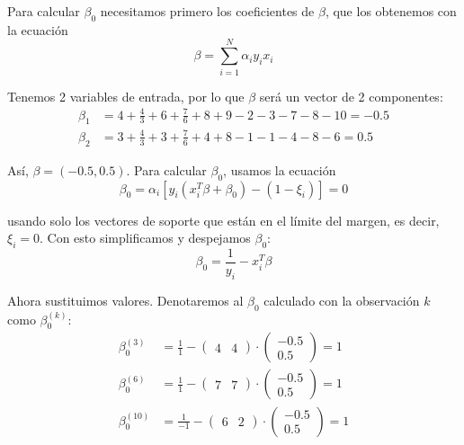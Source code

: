 \begin{example}
Para calcular $\beta_0$ necesitamos primero los coeficientes de $\beta$, que los obtenemos con la ecuación 
\begin{equation}
\beta = \sum_{i=1}^N \alpha_i y_i x_i
\end{equation}

\noindent Tenemos 2 variables de entrada, por lo que $\beta$ será un vector de 2 componentes: 
\begin{align*}
\beta_1 &= 4 + \frac{4}{3} + 6 + \frac{7}{6} + 8 + 9 - 2 - 3 - 7 - 8 - 10 = -0.5 \\
\beta_2 &= 3 + \frac{4}{3} + 3 + \frac{7}{6} + 4 + 8 - 1 - 1 - 4 - 8 - 6 = 0.5
\end{align*} 

\noindent Así, $\beta = (-0.5, 0.5)$. Para calcular $\beta_0$, usamos la ecuación
\begin{equation}
\beta_0 = \alpha_i [y_i(x_i^T \beta + \beta_0) - (1 - \xi_i)] = 0
\end{equation}

\noindent usando solo los vectores de soporte que están en el límite del margen, es decir, $\xi_i = 0$. Con esto simplificamos y despejamos $\beta_0$:
\begin{equation}
\beta_0 = \frac{1}{y_i} - x_i^T \beta
\end{equation}

\noindent Ahora sustituimos valores. Denotaremos al $\beta_0$ calculado con la observación $k$ como $\beta_{0}^{(k)}$:
\begin{align}
\beta_0^{(3)} &= \frac{1}{1} - \begin{pmatrix} 4 & 4 \end{pmatrix} \cdot \begin{pmatrix} -0.5 \\ 0.5 \end{pmatrix} = 1 \\
\beta_0^{(6)} &= \frac{1}{1} - \begin{pmatrix} 7 & 7 \end{pmatrix} \cdot \begin{pmatrix} -0.5 \\ 0.5 \end{pmatrix} = 1 \\
\beta_0^{(10)} &= \frac{1}{-1} - \begin{pmatrix} 6 & 2 \end{pmatrix} \cdot \begin{pmatrix} -0.5 \\ 0.5 \end{pmatrix} = 1
\end{align}


\end{example}
